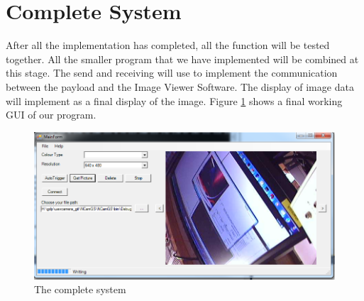 \section{Complete System}
After all the implementation has completed, all the function will be tested together. All the smaller program that we have implemented will be combined at this stage. The send and receiving will use to implement the communication between the payload and the Image Viewer Software. The display of image data will implement as a final display of the image.  Figure \ref{completeSystem} shows a final working GUI of our program. 
\begin{figure}[H]
\begin{center}
\includegraphics[width=1.0\textwidth]{testing_screenshots/ui.png} 
\end{center}
\caption{The complete system\label{completeSystem}}
\end{figure}



